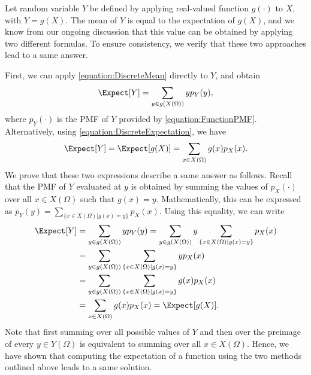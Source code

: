 Let random variable $Y$ be defined by applying real-valued function $g(\cdot)$ to $X$, with $Y = g(X)$.
The mean of $Y$ is equal to the expectation of $g(X)$, and we know from our ongoing discussion that this value can be obtained by applying two different formulas.
To ensure consistency, we verify that these two approaches lead to a same answer.

First, we can apply \eqref{equation:DiscreteMean} directly to $Y$, and obtain
\begin{equation*}
\Expect [Y] = \sum_{y \in g(X(\Omega))} y p_Y(y),
\end{equation*}
where $p_Y (\cdot)$ is the PMF of $Y$ provided by \eqref{equation:FunctionPMF}.
Alternatively, using \eqref{equation:DiscreteExpectation}, we have
\begin{equation*}
\Expect [Y] = \Expect [g(X)] = \sum_{x \in X(\Omega)} g(x) p_X(x) .
\end{equation*}
We prove that these two expressions describe a same answer as follows.
Recall that the PMF of $Y$ evaluated at $y$ is obtained by summing the values of $p_X(\cdot)$ over all $x \in X(\Omega)$ such that $g(x) = y$.
Mathematically, this can be expressed as $p_Y (y) = \sum_{ \{x \in X(\Omega) | g(x) = y \} } p_X (x)$.
Using this equality, we can write
\begin{equation*}
\begin{split}
\Expect [Y] &= \sum_{y \in g(X(\Omega))} y p_Y(y)
= \sum_{y \in g(X(\Omega))} y
\sum_{\{x \in X(\Omega) | g(x) = y\}} p_X(x) \\
&= \sum_{y \in g(X(\Omega))}
\sum_{\{x \in X(\Omega) | g(x) = y\}} y p_X(x) \\
&= \sum_{y \in g(X(\Omega))}
\sum_{\{x \in X(\Omega) | g(x) = y\}} g(x) p_X(x) \\
&= \sum_{x \in X(\Omega)} g(x) p_X(x)
= \Expect [g(X)] .
\end{split}
\end{equation*}
Note that first summing over all possible values of $Y$ and then over the preimage of every $y \in Y(\Omega)$ is equivalent to summing over all $x \in X(\Omega)$.
Hence, we have shown that computing the expectation of a function using the two methods outlined above leads to a same solution.

